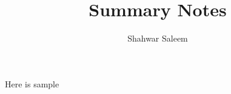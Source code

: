 \documentclass[a4paper, 8pt]{extarticle}
\title{Summary Notes}
\author{Shahwar Saleem}
\begin{document}
\begin{multicols*}{2}

Here is sample

\end{multicols*}
\end{document}
